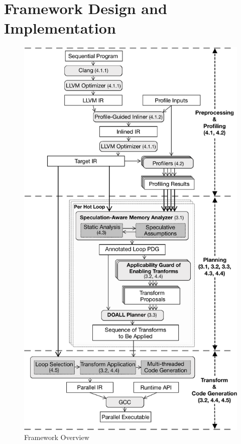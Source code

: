 \section{Framework Design and Implementation}

\begin{figure}[htp]
  \includegraphics[width=\columnwidth]{figures/compiler-pipeline-crop}
  \caption{\name Framework Overview}
  \label{fig:compiler-pipeline}
\end{figure}

